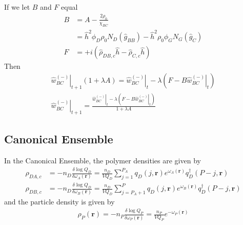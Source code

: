\documentclass{article}
\begin{document}
  If we let $B$ and $F$ equal
  \begin{align*}
    B &= A - \frac{2\rho_0}{\chi_{BC}} \\
      &=\hat{h}^2 \phi_D \rho_0 N_D
        (\hat{g}_{BB} ) 
        -  \hat{h} ^2  {\rho}_0  
          \phi_G N_G (\hat{g}_{C}) 
          \\
    F &= + i ( \hat{\rho}_{DB,c} \hat{h}
              - \hat{\rho}_{C,c} \hat{h} )
  \end{align*}
  Then
  \begin{align*}
    \left. \hat{w}_{BC}^{(-)} \right|_{t+1} ( 1 + \lambda A ) =
      \left. \hat{w}_{BC}^{(-)} \right|_t
      - \lambda \left( F - B \left. \hat{w}_{BC}^{(-)} \right|_t \right) \\
    \left. \hat{w}_{BC}^{(-)} \right|_{t+1} =
    \frac{\left. \hat{w}_{BC}^{(-)} \right|_t - \lambda
            \left( F - B \left. \hat{w}_{BC}^{(-)} \right|_t \right)}
         {1 + \lambda A}
  \end{align*}



    
  
  \subsection{Canonical Ensemble}
  
  In the Canonical Ensemble, the polymer densities are given by
  \begin{align*}
    \rho_{DA,c} &=
      -n_D \frac{\delta \log Q_D}{\delta \omega_A(\mathbf{r})}
      = \frac{n_D}{V Q_D}
      \sum_{j=1}^{P_A}
      q_D(j, \mathbf{r})
      e^{\omega_A(\mathbf{r})}
      q_D^\dagger(P-j, \mathbf{r}) \\
    \rho_{DB,c} &=
      -n_D \frac{\delta \log Q_D}{\delta \omega_B(\mathbf{r})}
      = \frac{n_D}{V Q_D}
      \sum_{j=P_A+1}^{P}
      q_D(j, \mathbf{r})
      e^ {\omega_B(\mathbf{r})}
      q_D^\dagger(P-j, \mathbf{r})
  \end{align*}
  and the particle density is given by
  \begin{align*}
    \rho_P(\mathbf{r}) =
      -n_P \frac{\delta \log Q_P}{\delta \omega_P(\mathbf{r})}
      = \frac{n_P}{V Q_P} e^{-\omega_P(\mathbf{r})}
  \end{align*}
  
  
\end{document}
